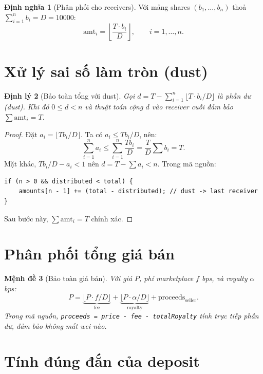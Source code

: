 \documentclass[12pt,a4paper,oneside]{report}
\theoremstyle{plain}
\newtheorem{theorem}{Định lý}[chapter]
\newtheorem{proposition}[theorem]{Mệnh đề}
\theoremstyle{definition}
\newtheorem{definition}[theorem]{Định nghĩa}
\theoremstyle{remark}
\begin{document}
\begin{definition}[Phân phối cho receivers]
Với mảng shares $(b_1, \ldots, b_n)$ thoả $\sum_{i=1}^{n} b_i = D = 10000$:
\[
  \text{amt}_i = \left\lfloor \frac{T \cdot b_i}{D} \right\rfloor, \qquad i = 1, \ldots, n.
\]
\end{definition}

\section{Xử lý sai số làm tròn (dust)}

\begin{theorem}[Bảo toàn tổng với dust]\label{thm:dust}
Gọi $d = T - \sum_{i=1}^{n} \lfloor T \cdot b_i / D \rfloor$ là phần dư (dust).
Khi đó $0 \le d < n$ và thuật toán cộng $d$ vào receiver cuối đảm bảo $\sum \text{amt}_i = T$.
\end{theorem}
\begin{proof}
Đặt $a_i = \lfloor T b_i / D \rfloor$. Ta có $a_i \le T b_i / D$, nên:
\[
  \sum_{i=1}^{n} a_i \le \sum_{i=1}^{n} \frac{T b_i}{D} = \frac{T}{D}\sum b_i = T.
\]
Mặt khác, $T b_i / D - a_i < 1$ nên $d = T - \sum a_i < n$. Trong mã nguồn:
\begin{lstlisting}[language=Solidity,numbers=none]
if (n > 0 && distributed < total) {
    amounts[n - 1] += (total - distributed); // dust -> last receiver
}
\end{lstlisting}
Sau bước này, $\sum \text{amt}_i = T$ chính xác.
\end{proof}

\section{Phân phối tổng giá bán}

\begin{proposition}[Bảo toàn giá bán]\label{prop:priceconserve}
Với giá $P$, phí marketplace $f$ bps, và royalty $\alpha$ bps:
\[
  P = \underbrace{\lfloor P \cdot f / D \rfloor}_{\text{fee}} +
      \underbrace{\lfloor P \cdot \alpha / D \rfloor}_{\text{royalty}} +
      \text{proceeds}_{\text{seller}}.
\]
Trong mã nguồn, \texttt{proceeds = price - fee - totalRoyalty} tính trực tiếp phần dư, đảm bảo
không mất wei nào.
\end{proposition}

\section{Tính đúng đắn của deposit}
\end{document}

